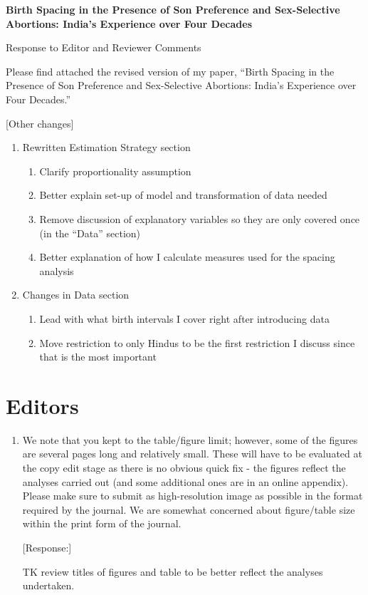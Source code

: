 \documentclass[letterpaper,12pt]{article}
\title{} \author{}
\begin{document}
\begin{center} \textbf{\large Birth Spacing in the Presence of Son
Preference and 
Sex-Selective Abortions: India's Experience over Four Decades}
\end{center}

\begin{center} Response to Editor and Reviewer Comments \end{center}

\noindent Please find attached the revised version of my paper,
``Birth Spacing in the Presence of Son Preference and Sex-Selective
Abortions:
India's Experience over Four Decades.''

[Other changes]
\begin{enumerate}
	\item Rewritten Estimation Strategy section
	\begin{enumerate}
		\item Clarify proportionality assumption
		\item Better explain set-up of model and transformation of data needed
		\item Remove discussion of explanatory variables so they are
		only covered once (in the ``Data'' section)
		\item Better explanation of how I calculate measures used for the spacing
		analysis
	\end{enumerate}
	\item Changes in Data section
	\begin{enumerate}
		\item Lead with what birth intervals I cover right after introducing
		data
		\item Move restriction to only Hindus to be the first restriction
		I discuss since that is the most important
	\end{enumerate}
\end{enumerate}


\section*{Editors}

\begin{enumerate}

\item We note that you kept to the table/figure limit; however, some of
the figures are several pages long and relatively small. These will have
to be evaluated at the copy edit stage as there is no obvious quick fix
- the figures reflect the analyses carried out (and some additional ones
are in an online appendix). Please make sure to submit as
high-resolution image as possible in the format required by the journal.
We are somewhat concerned about figure/table size within the print form
of the journal.

[Response:]

TK review titles of figures and table to be better reflect the
analyses undertaken.


\end{enumerate}
\end{document}
